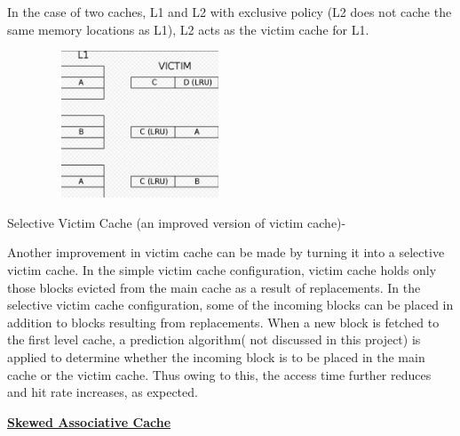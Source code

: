 \documentclass[12pt]{article}
\begin{document}
In the case of two caches, L1 and L2 with exclusive policy (L2 does not cache the same memory locations as L1), L2 acts as the victim cache for L1.\par


\vspace{\baselineskip}



\begin{figure}[H]
	\begin{Center}
		\includegraphics[width=2.28in,height=1.72in]{./media/image2.png}
	\end{Center}
\end{figure}



\par


\vspace{\baselineskip}
\setlength{\parskip}{8.04pt}
Selective Victim Cache (an improved version of victim cache)-\par

\setlength{\parskip}{6.96pt}
Another improvement in victim cache can be made by turning it into a selective victim cache. In the simple victim cache configuration, victim cache holds only those blocks evicted from the main cache as a result of replacements. In the selective victim cache configuration, some of the incoming blocks can be placed in addition to blocks resulting from replacements. When a new block is fetched to the first level cache, a prediction algorithm( not discussed in this project) is applied to determine whether the incoming block is to be placed in the main cache or the victim cache. Thus owing to this, the access time further reduces and hit rate increases, as expected.\par

{\fontsize{24pt}{28.8pt}\selectfont \textbf{\uline{Skewed Associative Cache}}\par}\par
\end{document}

